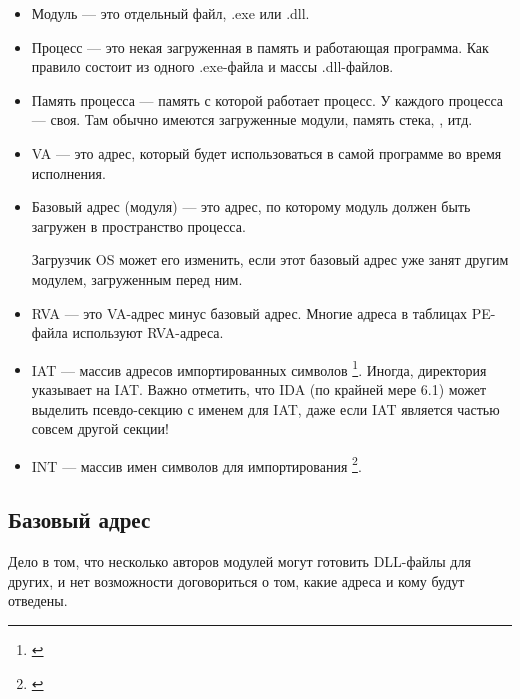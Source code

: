 \begin{itemize}
\item
Модуль --- это отдельный файл, .exe или .dll.

\item Процесс --- это некая загруженная в память и работающая программа.
Как правило состоит из одного .exe-файла и массы .dll-файлов.

\item Память процесса --- память с которой работает процесс.
У каждого процесса --- своя.
Там обычно имеются загруженные модули, память стека, , итд.

\item
{}
\ac{VA} --- это адрес, который будет использоваться в самой программе во время исполнения.

\item
{}
Базовый адрес (модуля) --- это адрес, по которому модуль должен быть загружен в пространство процесса.

Загрузчик \ac{OS} может его изменить, если этот базовый адрес уже занят другим модулем, загруженным перед ним.

\item
{}
\ac{RVA} --- это \ac{VA}-адрес минус базовый адрес. Многие адреса в таблицах PE-файла используют \ac{RVA}-адреса.


\item 
{}
\ac{IAT} --- массив адресов импортированных символов \footnote{\cite{Pietrek1}}. 
Иногда, директория  указывает на \ac{IAT}. 
\label{IDA_idata} Важно отметить, что \ac{IDA} (по крайней мере 6.1) может выделить псевдо-секцию с именем  для \ac{IAT}, даже если \ac{IAT} является частью совсем другой секции!

\item 
{}
\ac{INT} --- массив имен символов для импортирования \footnote{\cite{Pietrek1}}.
\end{itemize}

\subsection{Базовый адрес}

Дело в том, что несколько авторов модулей могут готовить DLL-файлы для других, и нет возможности договориться о том, какие адреса и кому будут отведены.

